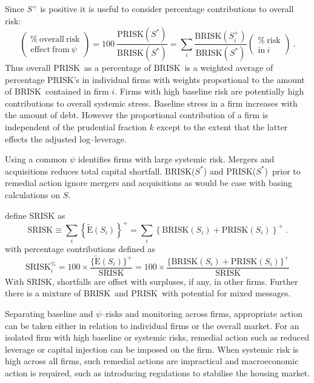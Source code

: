 \documentclass[authoryear]{elsarticle}
\newcommand{\E}{{\mathrm E}}
\newcommand{\be}[1]{\begin{equation}\label{#1}}
\newcommand{\ee}{\end{equation}}
\newcommand{\br}{\ensuremath{\mathrm{BRISK}}}
\newcommand{\pr}{\ensuremath{\mathrm{PRISK}}}
\begin{document}
Since $S^+$ is positive it is useful to consider percentage contributions to overall risk:
\begin{equation}\label{total2}
\left(\begin{array}{c}\%\ \mathrm{overall\ risk}\\ \mathrm{effect\ from}\ \psi\end{array}\right) = 100\ \frac{\pr(S^*)}{\br(S^*)}= \sum_i \frac{\br(S_i^+)}{\br(S^*)} \left(\begin{array}{c}\%\ \mathrm{risk}\\\mathrm{in }\ i \end{array}\right)\ .
\end{equation}
Thus overall \pr\  as a percentage of \br\   is  a weighted average of percentage \pr 's  in individual firms with weights   proportional to the amount of \br\  contained in firm $i$.  Firms with high baseline risk are potentially high contributions to overall systemic stress.    Baseline stress in a firm increases with the amount of debt.   However the proportional contribution of a firm is independent of the prudential fraction $k$ except to the extent that the latter effects the adjusted log--leverage.

Using a common $\psi$ identifies firms with large systemic risk.  Mergers and acquisitions reduces total capital shortfall. \br($S^*$)  and \pr($S^*$)\  prior to remedial action  ignore mergers and acquisitions as would be case with basing calculations on $S$.


\cite{brownlees2015} define SRISK as
\be{srisk}
\mathrm{SRISK} \equiv \sum_i\left\{\widetilde\E(S_i)\right\}^+=\sum_i\left\{\br(S_i)+\pr(S_i)\right\}^+\ .
\ee
with percentage contributions defined as
$$
\mathrm{SRISK}_i^\% = 100\times\frac{\{\widetilde\E(S_i)\}^+}{\mathrm{SRISK}}= 100\times \frac{\{\br(S_i)+\pr(S_i)\}^+}{\mathrm{SRISK}}
$$
With SRISK,  shortfalls are  offset with surpluses, if any, in other firms.
Further there is a mixture of \br\  and \pr\  with potential for mixed messages.

Separating  baseline and $\psi$--risks and monitoring  across firms, appropriate action can be taken either in relation to individual firms or the overall market. For an isolated firm with high baseline or systemic risks, remedial action such as reduced leverage or capital injection can be imposed on the firm. When systemic risk is high across all firms, such remedial actions are impractical and macroeconomic action is required, such as introducing regulations to stabilise the housing market.
\end{document}
